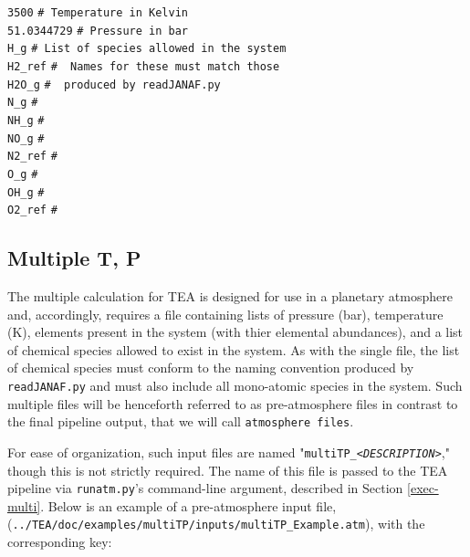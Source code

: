{\small
\begin{tabbing}
\texttt{3500} \hspace{1in} \= \texttt{\# Temperature in Kelvin} \\
\texttt{51.0344729} \> \texttt{\# Pressure in bar} \\
\texttt{H\_g}       \> \texttt{\# List of species allowed in the system} \\
\texttt{H2\_ref}    \> \texttt{\# ~Names for these must match those} \\
\texttt{H2O\_g}     \> \texttt{\# ~produced by readJANAF.py} \\
\texttt{N\_g}       \> \texttt{\#} \\
\texttt{NH\_g}      \> \texttt{\#} \\
\texttt{NO\_g}      \> \texttt{\#} \\
\texttt{N2\_ref}    \> \texttt{\#} \\
\texttt{O\_g}       \> \texttt{\#} \\
\texttt{OH\_g}      \> \texttt{\#} \\
\texttt{O2\_ref}    \> \texttt{\#} \\
\end{tabbing}
\normalsize

\subsection{Multiple T, P}
\label{PreAtmFileSec} 

  The multiple  calculation for TEA is designed for use in
  a planetary atmosphere and, accordingly, requires a file containing
  lists of pressure (bar), temperature (K), elements present in the
  system (with thier elemental abundances), and a list of chemical
  species allowed to exist in the system.  As with the single  file, the list of chemical species must conform to the naming
  convention produced by \texttt{readJANAF.py} and must also include
  all mono-atomic species in the system. Such multiple 
  files will be henceforth referred to as pre-atmosphere files in
  contrast to the final pipeline output, that we will
  call \texttt{atmosphere files}.
  
  For ease of organization, such input files are named
  "\texttt{multiTP\_\textit{<DESCRIPTION>}}," though this is not
  strictly required.  The name of this file is passed to the TEA
  pipeline via \texttt{runatm.py}'s command-line argument, described
  in Section \ref{exec-multi}. Below is an example of a pre-atmosphere
  input file,
  (\texttt{../TEA/doc/examples/multiTP/inputs/multiTP\_Example.atm}),
  with the corresponding key:\

}

